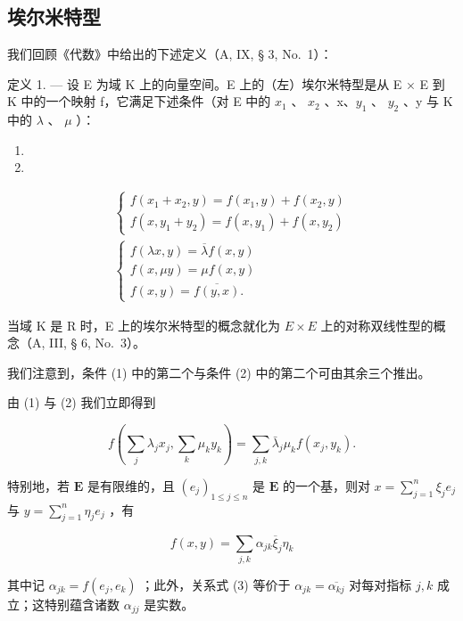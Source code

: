 \subsection{埃尔米特型}

我们回顾《代数》中给出的下述定义（A, IX, § 3, No.~1）：

定义 1. --- 设 E 为域 K 上的向量空间。E 上的（左）埃尔米特型是从 E × E 到 K 中的一个映射 f，它满足下述条件（对 E 中的 \(x_{1}\) 、 \(x_{2}\) 、x、\(y_{1}\) 、 \(y_{2}\) 、y 与 K 中的 \(\lambda\) 、 \(\mu\) ）：

\begin{enumerate}
\def\labelenumi{(\arabic{enumi})}
\tightlist
\item
\item
\end{enumerate}

\[
\begin{array}{c} \left\{ \begin{array}{l} f (x _ {1} + x _ {2}, y) = f (x _ {1}, y) + f (x _ {2}, y) \\ f (x, y _ {1} + y _ {2}) = f (x, y _ {1}) + f (x, y _ {2}) \end{array} \right. \\ \left\{ \begin{array}{l} f (\lambda x, y) = \overline {{\lambda}} f (x, y) \\ f (x, \mu y) = \mu f (x, y) \\ f (x, y) = \overline {{f (y , x)}}  . \end{array} \right. \end{array}\tag{3}
\]

当域 K 是 R 时，E 上的埃尔米特型的概念就化为 \(E \times E\) 上的对称双线性型的概念（A, III, § 6, No.~3）。

我们注意到，条件 (1) 中的第二个与条件 (2) 中的第二个可由其余三个推出。

由 (1) 与 (2) 我们立即得到

\[
f \left(\sum_ {j} \lambda_ {j} x _ {j}, \sum_ {k} \mu_ {k} y _ {k}\right) = \sum_ {j, k} \bar {\lambda} _ {j} \mu_ {k} f \left(x _ {j}, y _ {k}\right).\tag{4}
\]

特别地，若 \(\mathbf{E}\) 是有限维的，且 \((e_j)_{1 \leqslant j \leqslant n}\) 是 \(\mathbf{E}\) 的一个基，则对 \(x = \sum_{j=1}^{n} \xi_j e_j\) 与 \(y = \sum_{j=1}^{n} \eta_j e_j\) ，有

\[
f (x, y) = \sum_ {j, k} \alpha_ {j k} \overline {{{{\xi}}}} _ {j} \eta_ {k}
\]

其中记 \(\alpha_{jk} = f(e_j, e_k)\) ；此外，关系式 (3) 等价于 \(\alpha_{jk} = \overline{\alpha_{kj}}\) 对每对指标 \(j, k\) 成立；这特别蕴含诸数 \(\alpha_{jj}\) 是实数。

